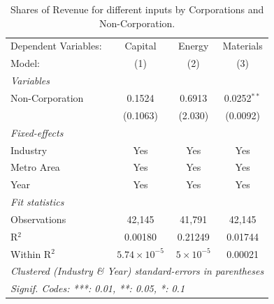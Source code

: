 \documentclass[
  12pt]{article}
\theoremstyle{definition}
\theoremstyle{remark}
\begin{document}
\begin{table}

\caption{\label{tbl-reg-shares}Shares of Revenue for different inputs by
Corporations and Non-Corporation.}

\begin{minipage}{\linewidth}

\begingroup
\centering
\begin{tabular}{lccc}
   \tabularnewline \midrule \midrule
   Dependent Variables: & Capital               & Energy             & Materials\\  
   Model:               & (1)                   & (2)                & (3)\\  
   \midrule
   \emph{Variables}\\
   Non-Corporation      & 0.1524                & 0.6913             & 0.0252$^{**}$\\   
                        & (0.1063)              & (2.030)            & (0.0092)\\   
   \midrule
   \emph{Fixed-effects}\\
   Industry             & Yes                   & Yes                & Yes\\  
   Metro Area           & Yes                   & Yes                & Yes\\  
   Year                 & Yes                   & Yes                & Yes\\  
   \midrule
   \emph{Fit statistics}\\
   Observations         & 42,145                & 41,791             & 42,145\\  
   R$^2$                & 0.00180               & 0.21249            & 0.01744\\  
   Within R$^2$         & $5.74\times 10^{-5}$  & $5\times 10^{-5}$  & 0.00021\\  
   \midrule \midrule
   \multicolumn{4}{l}{\emph{Clustered (Industry \& Year) standard-errors in parentheses}}\\
   \multicolumn{4}{l}{\emph{Signif. Codes: ***: 0.01, **: 0.05, *: 0.1}}\\
\end{tabular}
\par\endgroup

\end{minipage}%

\end{table}%
\end{document}
